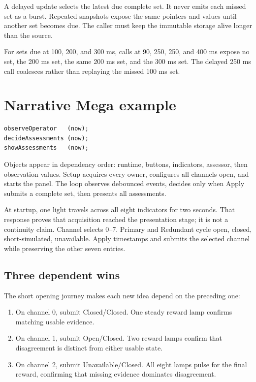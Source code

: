 \documentclass[11pt]{article}
\begin{document}
A delayed update selects the latest due complete set. It never emits each
missed set as a burst. Repeated snapshots expose the same pointers and values
until another set becomes due. The caller must keep the immutable storage alive
longer than the source.

For sets due at 100, 200, and 300 ms, calls at 90, 250, 250, and 400 ms expose
no set, the 200 ms set, the same 200 ms set, and the 300 ms set. The delayed
250 ms call coalesces rather than replaying the missed 100 ms set.

\section{Narrative Mega example}

\begin{lstlisting}[style=adkcpp]
observeOperator   (now);
decideAssessments (now);
showAssessments   (now);
\end{lstlisting}

Objects appear in dependency order: runtime, buttons, indicators, assessor,
then observation values. Setup acquires every owner, configures all channels
open, and starts the panel. The loop observes debounced events, decides only
when Apply submits a complete set, then presents all assessments.

At startup, one light travels across all eight indicators for two seconds.
That response proves that acquisition reached the presentation stage; it is
not a continuity claim. Channel selects 0--7. Primary and Redundant cycle
open, closed, short-simulated, unavailable. Apply timestamps and submits the
selected channel while preserving the other seven entries.

\subsection{Three dependent wins}

The short opening journey makes each new idea depend on the preceding one:

\begin{enumerate}
  \item On channel 0, submit Closed/Closed. One steady reward lamp confirms
        matching usable evidence.
  \item On channel 1, submit Open/Closed. Two reward lamps confirm that
        disagreement is distinct from either usable state.
  \item On channel 2, submit Unavailable/Closed. All eight lamps pulse for the
        final reward, confirming that missing evidence dominates disagreement.
\end{enumerate}
\end{document}
